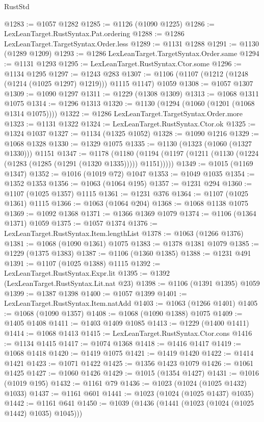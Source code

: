 \begin{lexlean}{RustStd}
\begin{coremodule}
{\begin{coremodule}
{{{{{{{{{{{{{{{{{{{{{{{{{{{{{{{{{{{@1283 := @1057 @1282
@1285 := @1126 (@1090 @1225)
@1286 := LexLeanTarget.RustSyntax.Pat.ordering
@1288 := @1286 LexLeanTarget.TargetSyntax.Order.less
@1289 := @1131 @1288
@1291 := @1130 (@1289 @1209)
@1293 := @1286 LexLeanTarget.TargetSyntax.Order.same
@1294 := @1131 @1293
@1295 := LexLeanTarget.RustSyntax.Ctor.some
@1296 := @1134 @1295
@1297 := @1243 @283
@1307 := @1106 (@1107 (@1212 (@1248 (@1214 (@1025 @1297) @1219))) @1115 @1147) @1059
@1308 := @1057 @1307
@1309 := @1090 @1297
@1311 := @1229 (@1308 @1309)
@1313 := @1068 @1311 @1075
@1314 := @1296 @1313
@1320 := @1130 (@1294 (@1060 (@1201 (@1068 @1314 @1075))))
@1322 := @1286 LexLeanTarget.TargetSyntax.Order.more
@1323 := @1131 @1322
@1324 := LexLeanTarget.RustSyntax.Ctor.ok
@1325 := @1324 @1037
@1327 := @1134 (@1325 @1052)
@1328 := @1090 @1216
@1329 := @1068 @1328
@1330 := @1329 @1075
@1335 := @1130 (@1323 (@1060 (@1327 @1330))) @1151
@1347 := @1178
    (@1180 (@1194 (@1197 (@1211 (@1130 (@1224 (@1283 (@1285 (@1291 (@1320 @1335))))) @1151)))))
@1349 := @1015 (@1169 @1347)
@1352 := @1016 (@1019 @72) @1047
@1353 := @1049 @1035
@1354 := @1352 @1353
@1356 := @1063 (@1064 @195)
@1357 := @1231 @294
@1360 := @1107 (@1025 @1357) @1115
@1361 := @1231 @376
@1364 := @1107 (@1025 @1361) @1115
@1366 := @1063 (@1064 @204)
@1368 := @1068 @1138 @1075
@1369 := @1092 @1368
@1371 := @1366 @1369 @1079
@1374 := @1106 (@1364 @1371) @1059
@1375 := @1057 @1374
@1376 := LexLeanTarget.RustSyntax.Item.lengthList
@1378 := @1063 (@1266 @1376)
@1381 := @1068 (@1090 @1361) @1075
@1383 := @1378 @1381 @1079
@1385 := @1229 (@1375 @1383)
@1387 := @1106 (@1360 @1385)
@1388 := @1231 @491
@1391 := @1107 (@1025 @1388) @1115
@1392 := LexLeanTarget.RustSyntax.Expr.lit
@1395 := @1392 (LexLeanTarget.RustSyntax.Lit.nat @23)
@1398 := @1106 (@1391 @1395) @1059
@1399 := @1387 @1398
@1400 := @1057 @1399
@1401 := LexLeanTarget.RustSyntax.Item.natAdd
@1403 := @1063 (@1266 @1401)
@1405 := @1068 (@1090 @1357)
@1408 := @1068 (@1090 @1388) @1075
@1409 := @1405 @1408
@1411 := @1403 @1409 @1085
@1413 := @1229 (@1400 @1411)
@1414 := @1068 @1413
@1415 := LexLeanTarget.RustSyntax.Ctor.cons
@1416 := @1134 @1415
@1417 := @1074 @1368
@1418 := @1416 @1417
@1419 := @1068 @1418
@1420 := @1419 @1075
@1421 := @1419 @1420
@1422 := @1414 @1421
@1423 := @1071 @1422
@1425 := @1356 @1423 @1079
@1426 := @1061 @1425
@1427 := @1060 @1426
@1429 := @1015 (@1354 @1427)
@1431 := @1016 (@1019 @195)
@1432 := @1161 @79
@1436 := @1023 (@1024 (@1025 @1432) @1033)
@1437 := @1161 @601
@1441 := @1023 (@1024 (@1025 @1437) @1035)
@1442 := @1161 @641
@1450 := @1039 (@1436 (@1441 (@1023 (@1024 (@1025 @1442) @1035) @1045)))
}}}}}}}}}}}}}}}}}}}}}}}}}}}}}}}}}}}
\end{coremodule}}
\end{coremodule}
\end{lexlean}
